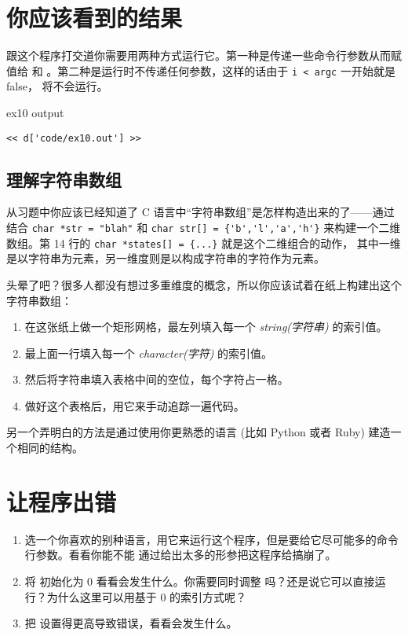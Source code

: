 \section{你应该看到的结果}

跟这个程序打交道你需要用两种方式运行它。第一种是传递一些命令行参数从而赋值给  和  。第二种是运行时不传递任何参数，这样的话由于 \verb|i < argc|
一开始就是 false， 将不会运行。

\begin{code}{ex10 output}
\begin{lstlisting}
<< d['code/ex10.out'] >>
\end{lstlisting}
\end{code}

\subsection{理解字符串数组}

从习题中你应该已经知道了 C 语言中“字符串数组”是怎样构造出来的了——通过结合
 \verb|char *str = "blah"| 和 \verb|char str[] = {'b','l','a','h'}| 
 来构建一个二维数组。第 14 行的 \verb|char *states[] = {...}| 就是这个二维组合的动作，
 其中一维是以字符串为元素，另一维度则是以构成字符串的字符作为元素。

头晕了吧？很多人都没有想过多重维度的概念，所以你应该试着在纸上构建出这个字符串数组：

\begin{enumerate}
\item 在这张纸上做一个矩形网格，最左列填入每一个 \emph{string(字符串)} 的索引值。
\item 最上面一行填入每一个 \emph{character(字符)} 的索引值。
\item 然后将字符串填入表格中间的空位，每个字符占一格。
\item 做好这个表格后，用它来手动追踪一遍代码。
\end{enumerate}

另一个弄明白的方法是通过使用你更熟悉的语言 (比如 Python 或者 Ruby) 建造一个相同的结构。

\section{让程序出错}

\begin{enumerate}
\item 选一个你喜欢的别种语言，用它来运行这个程序，但是要给它尽可能多的命令行参数。看看你能不能
通过给出太多的形参把这程序给搞崩了。
\item 将  初始化为 0 看看会发生什么。你需要同时调整  吗？还是说它可以直接运行？为什么这里可以用基于 0 的索引方式呢？
\item 把  设置得更高导致错误，看看会发生什么。
\end{enumerate}

